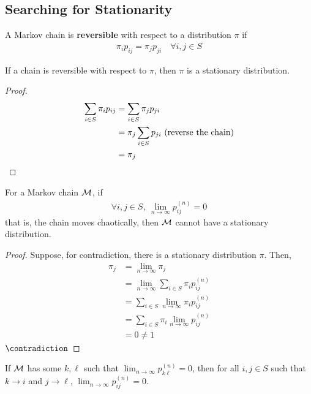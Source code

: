 \documentclass{article}
\newcommand{\upn}[0]{^{(n)}}
\begin{document}
    \subsection{Searching for Stationarity}
    \begin{definition}
    	A Markov chain is \textbf{reversible} with respect to a distribution $\pi$ if 
	    \begin{align}
	    	\pi_i p_{ij} = \pi_j p_{ji}\quad \forall i, j \in S
	    \end{align}
	\end{definition}

	\begin{theorem}
		If a chain is reversible with respect to $\pi$, then $\pi$ is a stationary distribution.
	\end{theorem}
	
	\begin{proof}
		\begin{align}
			\sum_{i \in S} \pi_i p_{ij} &= \sum_{i \in S} \pi_j p_{ji} \\
			&= \pi_j \sum_{i \in S} p_{ji} \text{{ (reverse the chain)}}\\
			&= \pi_j
		\end{align}
	\end{proof}
	
	\begin{theorem}
		For a Markov chain $\mathcal{{M}}$, if
		\begin{align}
			\forall i, j \in S,\ \lim_{n\to\infty} p_{ij}\upn = 0
		\end{align}
		that is, the chain moves chaotically, 
		then $\mathcal{{M}}$ cannot have a stationary distribution.
	\end{theorem}
	
	\begin{proof}
		Suppose, for contradiction, there is a stationary distribution $\pi$. Then,
		\begin{align}
			\pi_j &= \lim_{n \to \infty} \pi_j \\
			&= \lim_{n \to \infty} \sum_{i \in S} \pi_i p_{ij}\upn \\
			&= \sum_{i \in S} \lim_{n \to \infty} \pi_i p_{ij}\upn \\
			&= \sum_{i \in S} \pi_i \lim_{n \to \infty} p_{ij}\upn \\
			&= 0 \neq 1
		\end{align}
		$\contradiction$
	\end{proof}
	
	\begin{lemma}
		If $\mathcal{{M}}$ has some $k, \ell$ such that $\lim_{n \to \infty} p_{k\ell}\upn = 0$, then for all $i, j \in S$
		such that $k \to i$ and $j \to \ell$,
		$\lim_{n \to \infty} p_{ij}\upn = 0$.
	\end{lemma}
	
\end{document}
